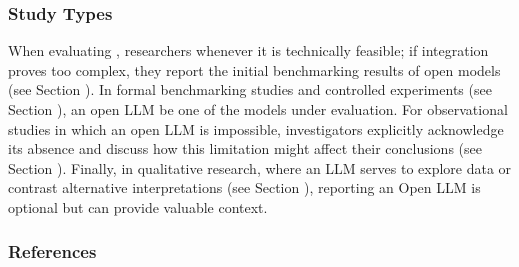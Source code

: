 \subsubsection{Study Types}

When evaluating \newtools, researchers \should \openllm whenever it is technically feasible; if integration proves too complex, they \must report the initial benchmarking results of open models (see Section \benchmarksmetrics). In formal benchmarking studies and controlled experiments (see Section \benchmarkingtasks), an open LLM \must be one of the models under evaluation. For observational studies in which an open LLM is impossible, investigators \should explicitly acknowledge its absence and discuss how this limitation might affect their conclusions (see Section \limitationsmitigations). Finally, in qualitative research, where an LLM serves to explore data or contrast alternative interpretations (see Section \synthesis), reporting an Open LLM is optional but can provide valuable context.


\subsubsection{References}





